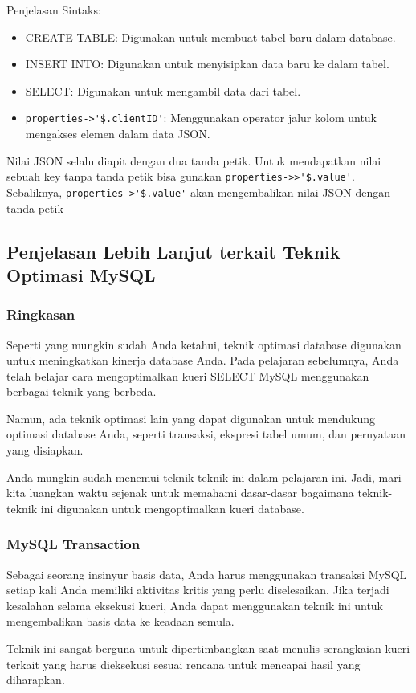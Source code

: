 \documentclass{article}
\begin{document}
Penjelasan Sintaks:
\begin{itemize}
    \item CREATE TABLE: Digunakan untuk membuat tabel baru dalam database.
    \item INSERT INTO: Digunakan untuk menyisipkan data baru ke dalam tabel.
    \item SELECT: Digunakan untuk mengambil data dari tabel.
    \item \verb|properties->'$.clientID'|: Menggunakan operator jalur kolom untuk mengakses elemen dalam data JSON.
\end{itemize}

Nilai JSON selalu diapit dengan dua tanda petik. Untuk mendapatkan nilai sebuah key tanpa tanda petik bisa gunakan \verb|properties->>'$.value'|. Sebaliknya, \verb|properties->'$.value'| akan mengembalikan nilai JSON dengan tanda petik

\subsection{Penjelasan Lebih Lanjut terkait Teknik Optimasi MySQL}
\subsubsection{Ringkasan}
Seperti yang mungkin sudah Anda ketahui, teknik optimasi database digunakan untuk meningkatkan kinerja database Anda. Pada pelajaran sebelumnya, Anda telah belajar cara mengoptimalkan kueri SELECT MySQL menggunakan berbagai teknik yang berbeda.

Namun, ada teknik optimasi lain yang dapat digunakan untuk mendukung optimasi database Anda, seperti transaksi, ekspresi tabel umum, dan pernyataan yang disiapkan.

Anda mungkin sudah menemui teknik-teknik ini dalam pelajaran ini. Jadi, mari kita luangkan waktu sejenak untuk memahami dasar-dasar bagaimana teknik-teknik ini digunakan untuk mengoptimalkan kueri database.

\subsubsection{MySQL Transaction}
Sebagai seorang insinyur basis data, Anda harus menggunakan transaksi MySQL setiap kali Anda memiliki aktivitas kritis yang perlu diselesaikan. Jika terjadi kesalahan selama eksekusi kueri, Anda dapat menggunakan teknik ini untuk mengembalikan basis data ke keadaan semula.

Teknik ini sangat berguna untuk dipertimbangkan saat menulis serangkaian kueri terkait yang harus dieksekusi sesuai rencana untuk mencapai hasil yang diharapkan.
\end{document}
